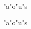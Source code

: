 \documentclass{article}
\begin{document}
\def\mydef{"a"o"u"s}

\begin{figure}
\caption{"a"o"u"s}
\end{figure}

\begin{figure}
\caption{\mydef}
\end{figure}
\end{document}
